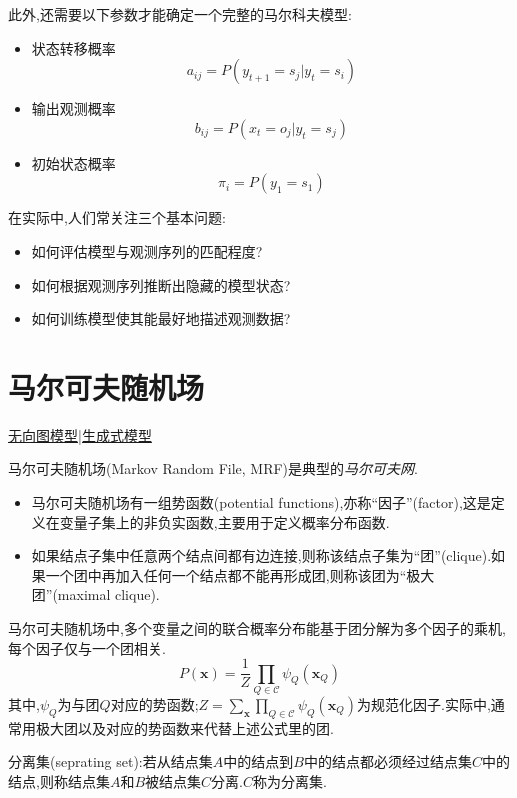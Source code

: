 此外,还需要以下参数才能确定一个完整的马尔科夫模型:
\begin{itemize}
\item 状态转移概率
\begin{equation}
a_{ij}=P(y_{t+1}=s_j|y_t=s_i)
\end{equation}
\item 输出观测概率
\begin{equation}
b_{ij}=P(x_t=o_j|y_t=s_j)
\end{equation}
\item 初始状态概率
\begin{equation}
\pi_i=P(y_1=s_1)
\end{equation}
\end{itemize}

在实际中,人们常关注三个基本问题:
\begin{itemize}
\item 如何评估模型与观测序列的匹配程度?
\item 如何根据观测序列推断出隐藏的模型状态?
\item 如何训练模型使其能最好地描述观测数据?
\end{itemize}

\section{马尔可夫随机场}
\underline{无向图模型|生成式模型}

马尔可夫随机场(Markov Random File, MRF)是典型的\textit{马尔可夫网}.
\begin{itemize}
\item 马尔可夫随机场有一组势函数(potential functions),亦称``因子''(factor),这是定义在变量子集上的非负实函数,主要用于定义概率分布函数.
\item 如果结点子集中任意两个结点间都有边连接,则称该结点子集为``团''(clique).如果一个团中再加入任何一个结点都不能再形成团,则称该团为``极大团''(maximal clique).
\end{itemize}

马尔可夫随机场中,多个变量之间的联合概率分布能基于团分解为多个因子的乘机,每个因子仅与一个团相关.
\begin{equation}
P(\bm x)=\frac{1}{Z}\prod_{Q\in\mathcal C}\psi_Q(\bm x_Q)
\end{equation}
其中,$\psi_Q$为与团$Q$对应的势函数;$Z=\sum_{\bm x}\prod_{Q\in\mathcal C}\psi_Q(\bm x_Q)$为规范化因子.实际中,通常用极大团以及对应的势函数来代替上述公式里的团.

分离集(seprating set):若从结点集$A$中的结点到$B$中的结点都必须经过结点集$C$中的结点,则称结点集$A$和$B$被结点集$C$分离.$C$称为分离集.


